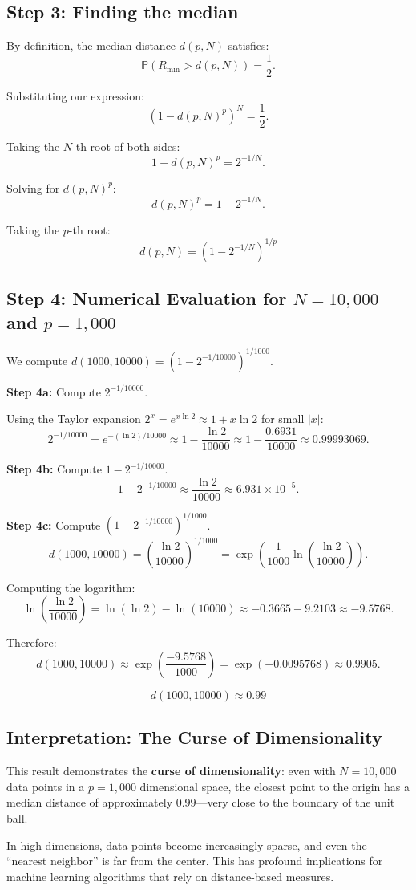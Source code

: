 \documentclass{article}
\begin{document}
\subsection*{Step 3: Finding the median}

By definition, the median distance $d(p,N)$ satisfies:
\[
\mathbb{P}(R_{\min} > d(p,N)) = \frac{1}{2}.
\]

Substituting our expression:
\[
(1 - d(p,N)^p)^N = \frac{1}{2}.
\]

Taking the $N$-th root of both sides:
\[
1 - d(p,N)^p = 2^{-1/N}.
\]

Solving for $d(p,N)^p$:
\[
d(p,N)^p = 1 - 2^{-1/N}.
\]

Taking the $p$-th root:
\[
\boxed{d(p,N) = \left(1 - 2^{-1/N}\right)^{1/p}}
\]

\subsection*{Step 4: Numerical Evaluation for $N=10{,}000$ and $p=1{,}000$}

We compute $d(1000, 10000) = \left(1 - 2^{-1/10000}\right)^{1/1000}$.

\textbf{Step 4a:} Compute $2^{-1/10000}$.

Using the Taylor expansion $2^x = e^{x\ln 2} \approx 1 + x\ln 2$ for small $|x|$:
\[
2^{-1/10000} = e^{-(\ln 2)/10000} \approx 1 - \frac{\ln 2}{10000} \approx 1 - \frac{0.6931}{10000} \approx 0.99993069.
\]

\textbf{Step 4b:} Compute $1 - 2^{-1/10000}$.
\[
1 - 2^{-1/10000} \approx \frac{\ln 2}{10000} \approx 6.931 \times 10^{-5}.
\]

\textbf{Step 4c:} Compute $\left(1 - 2^{-1/10000}\right)^{1/1000}$.
\[
d(1000, 10000) = \left(\frac{\ln 2}{10000}\right)^{1/1000} = \exp\left(\frac{1}{1000}\ln\left(\frac{\ln 2}{10000}\right)\right).
\]

Computing the logarithm:
\[
\ln\left(\frac{\ln 2}{10000}\right) = \ln(\ln 2) - \ln(10000) \approx -0.3665 - 9.2103 \approx -9.5768.
\]

Therefore:
\[
d(1000, 10000) \approx \exp\left(\frac{-9.5768}{1000}\right) = \exp(-0.0095768) \approx 0.9905.
\]

\[
\boxed{d(1000, 10000) \approx 0.99}
\]

\subsection*{Interpretation: The Curse of Dimensionality}

This result demonstrates the \textbf{curse of dimensionality}: even with $N=10{,}000$ data points in a $p=1{,}000$ dimensional space, the closest point to the origin has a median distance of approximately $0.99$---very close to the boundary of the unit ball.

In high dimensions, data points become increasingly sparse, and even the ``nearest neighbor'' is far from the center. This has profound implications for machine learning algorithms that rely on distance-based measures.
\end{document}
